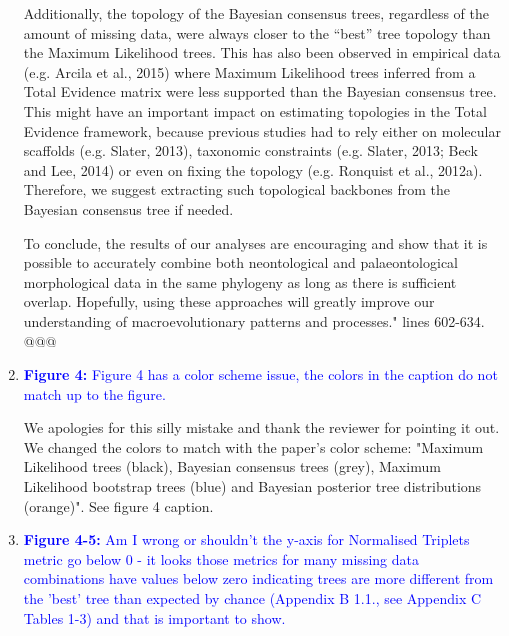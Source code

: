 \documentclass[12pt,letterpaper]{article}
\begin{document}
\begin{enumerate}
Additionally, the topology of the Bayesian consensus trees, regardless of the amount of missing data, were always closer to the ``best'' tree topology than the Maximum Likelihood trees.
This has also been observed in empirical data (e.g. Arcila et al., 2015) where Maximum Likelihood trees inferred from a Total Evidence matrix were less supported than the Bayesian consensus tree.
This might have an important impact on estimating topologies in the Total Evidence framework, because previous studies had to rely either on molecular scaffolds (e.g. Slater, 2013), taxonomic constraints (e.g. Slater, 2013; Beck and Lee, 2014) or even on fixing the topology (e.g. Ronquist et al., 2012a).
Therefore, we suggest extracting such topological backbones from the Bayesian consensus tree if needed.

To conclude, the results of our analyses are encouraging and show that it is possible to accurately combine both neontological and palaeontological morphological data in the same phylogeny as long as there is sufficient overlap.
Hopefully, using these approaches will greatly improve our understanding of macroevolutionary patterns and processes." lines 602-634. @@@


\item{\textcolor{blue}{\textbf{Figure 4:} Figure 4 has a color scheme issue, the colors in the caption do not match up to the figure.}}

We apologies for this silly mistake and thank the reviewer for pointing it out. We changed the colors to match with the paper's color scheme: "Maximum Likelihood trees (black), Bayesian consensus trees (grey), Maximum Likelihood bootstrap trees (blue) and Bayesian posterior tree distributions (orange)". See figure 4 caption.


\item{\textcolor{blue}{\textbf{Figure 4-5:} Am I wrong or shouldn't the y-axis for Normalised Triplets metric go below 0 - it looks those metrics for many missing data combinations have values below zero indicating trees are more different from the 'best' tree than expected by chance (Appendix B 1.1., see Appendix C Tables 1-3) and that is important to show.}}


\end{enumerate}
\end{document}
